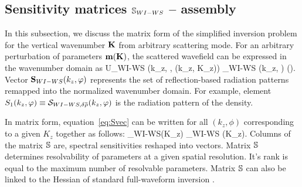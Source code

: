 \subsection{Sensitivity matrices $\mathbb{S}_{WI-WS}$ -- assembly}
In this subsection, we discuss the matrix form of the simplified inversion problem for the vertical wavenumber $\mathbf{K}$ from arbitrary scattering mode.   
%
For an arbitrary perturbation of parameters $\mathbf{m} (\mathbf{K})$, the scattered wavefield can be expressed in the wavenumber domain as
\vspace*{-0.02\columnwidth}
\beq \label{eq:Svec}
\delta U_{WI-WS} (k_z, \phi, \omega(k_z, K_z)) \propto \Sv_{WI-WS} (k_z, \varphi) \delta \mv (\Kv).
\eeq
Vector $\mathbf{S}_{WI-WS}(k_z,\varphi)$ represents the set of reflection-based radiation patterns remapped into the normalized wavenumber domain. For example, element $S_1(k_z,\varphi) \equiv \mathcal{S}_{WI-WS,\delta \mathbf{\bar{\text{$\rho$}}}}(k_z,\varphi)$ is the radiation pattern of the density.

In matrix form, equation~\eqref{eq:Svec} can be written for all $(k_z,\phi)$ corresponding to a given $K_z$ together as follows:
\beq
\delta \Uv_{WI-WS}(K_z) \propto \Smat_{WI-WS} \delta \mv(K_z).
\eeq
Columns of the matrix $\mathbb{S}$ are, spectral sensitivities reshaped into vectors. Matrix $\mathbb{S}$ determines resolvability of parameters at a given spatial resolution. It's rank is equal to the maximum number of resolvable parameters. Matrix $\mathbb{S}$ can also be linked to the Hessian of standard full-waveform inversion \citep{kazei2018, podgornova2018}.

%

